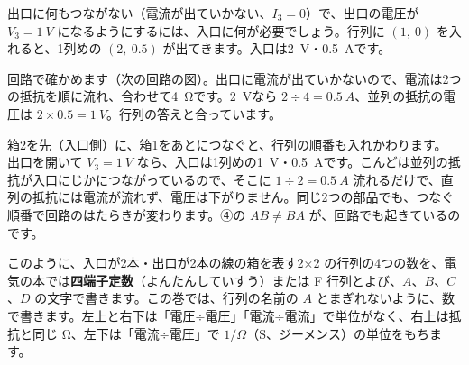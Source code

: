出口に何もつながない（電流が出ていかない、$I_3=0$）で、出口の電圧が $V_3=\qty{1}{V}$ になるようにするには、入口に何が必要でしょう。行列に $(1,\ 0)$ を入れると、1列めの $(2,\ 0.5)$ が出てきます。入口は\qty{2}{V}・\qty{0.5}{A}です。

回路で確かめます（次の回路の図）。出口に電流が出ていかないので、電流は2つの抵抗を順に流れ、合わせて\qty{4}{\ohm}です。\qty{2}{V}なら $2\div4=\qty{0.5}{A}$、並列の抵抗の電圧は $2\times0.5=\qty{1}{V}$。行列の答えと合っています。
\begin{bkcenter}
\end{bkcenter}

箱2を先（入口側）に、箱1をあとにつなぐと、行列の順番も入れかわります。
出口を開いて $V_3=\qty{1}{V}$ なら、入口は1列めの\qty{1}{V}・\qty{0.5}{A}です。こんどは並列の抵抗が入口にじかにつながっているので、そこに $1\div2=\qty{0.5}{A}$ 流れるだけで、直列の抵抗には電流が流れず、電圧は下がりません。同じ2つの部品でも、つなぐ順番で回路のはたらきが変わります。④の $AB\neq BA$ が、回路でも起きているのです。

このように、入口が2本・出口が2本の線の箱を表す2×2 の行列の4つの数を、電気の本では\textbf{四端子定数}（よんたんしていすう）または F 行列とよび、$A$、$B$、$C$、$D$ の文字で書きます。この巻では、行列の名前の $A$ とまぎれないように、数で書きます。左上と右下は「電圧÷電圧」「電流÷電流」で単位がなく、右上は抵抗と同じ Ω、左下は「電流÷電圧」で $1/\Omega$（S、ジーメンス）の単位をもちます。

